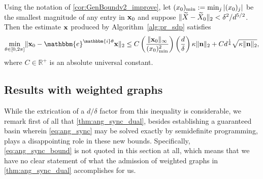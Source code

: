 
\begin{corollary}
Using the notation of \cref{cor:GenBoundv2_improve}, let $(x_0)_{\rm min} := \min_j |(x_0)_j|$ be the smallest magnitude of any entry in $\mathbf{x}_0$ and suppose $\lVert\widetilde{X} - \widetilde{X}_0\rVert_2 < \delta^2 / d^{5/2}$.  Then the estimate $\mathbf{x}$ produced by Algorithm~\ref{alg:pr_sdp} satisfies 
\begin{equation} \min_{\theta \in [0, 2 \pi]} \norm{\x_0 - \mathbbm{e}^{\mathbbm{i} \theta} \x}_2 \leq C \left( \frac{\norm{\x_0}_{\infty}}{(x_0)^2_{\rm min}} \right) \left( \frac{d}{\delta} \right) \kappa \| \n \|_2 + C d^{\frac{1}{4}} \sqrt{\kappa \| \n \|_2 }, \label{eq:main_improve} \end{equation}
where $C \in \mathbb{R}^+$ is an absolute universal constant.  
\label{cor:main_improve}
\end{corollary}

\subsection{Results with weighted graphs}
While the extrication of a $d / \delta$ factor from this inequality is considerable, we remark first of all that \cref{thm:ang_sync_dual}, besides establishing a guaranteed basin wherein \eqref{eq:ang_sync} may be solved exactly by semidefinite programming, plays a disappointing role in these new bounds.  Specifically, \eqref{eq:ang_sync_bound} is not quoted in this section at all, which means that we have no clear statement of what the admission of weighted graphs in \cref{thm:ang_sync_dual} accomplishes for us.

